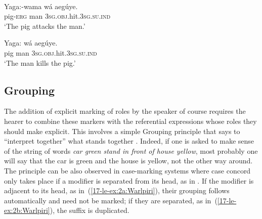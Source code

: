 \documentclass[output=paper]{LSP/langsci}
\begin{document}
\ea \label{17-le-ex:1:Fore}
\\
\begin{xlist}

\ex \label{17-le-ex:1a:Fore}
	\gll Yaga:-wama w\'a aeg\'uye.\\
		pig-\textsc{erg} man \textsc{3sg.obj.}hit\textsc{.3sg.su.ind}\\
	\glt `The pig attacks the man.' 

\ex \label{17-le-ex:1b:Fore}
	\gll Yaga: w\'a aeg\'uye.\\
		pig man \textsc{3sg.obj.}hit\textsc{.3sg.su.ind}\\
	\glt `The man kills the pig.' 
	
\end{xlist}
\z

\subsection{Grouping}\label{17-le-sec:Event-Grouping}
The addition of explicit marking of roles by the speaker of course requires the hearer to combine these markers with the referential expressions whose roles they should make explicit. This involves a simple Grouping principle that says to ``interpret together'' what stands together \citep{Givon1995Functionalism, Jackendoff2002Foundations}. Indeed, if one is asked to make sense of the string of words \textit{car green stand in front of house yellow}, most probably one will say that the car is green and the house is yellow, not the other way around. The principle can be also observed in case-marking systems where case concord only takes place if a modifier is separated from its head, as in . If the modifier is adjacent to its head, as in~(\ref{17-le-ex:2a:Warlpiri}), their grouping follows automatically and need not be marked; if they are separated, as in~(\ref{17-le-ex:2b:Warlpiri}), the  suffix is duplicated. 

\end{document}

